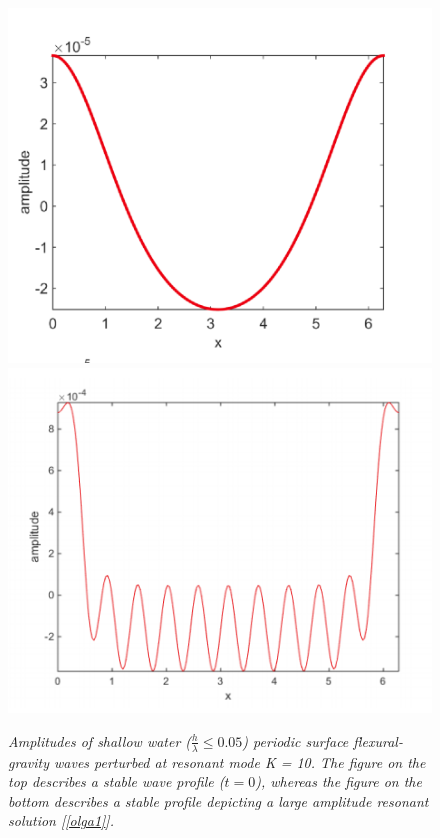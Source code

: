 \documentclass{article}
\begin{document}
\begin{figure}[hbt!]
\centering
\includegraphics[width=.5\textwidth]{Profile1.png}\hfill
\includegraphics[width=.5\textwidth]{Profile2.png}\hfill
\caption{\emph{Amplitudes of shallow water (\(\frac{h}{\lambda} \leq 0.05\)) periodic surface flexural-gravity waves perturbed at resonant mode K = 10. The figure on the top describes a stable wave profile (\(t = 0\)), whereas the figure on the bottom describes a stable profile depicting a large amplitude resonant solution [\ref{olga1}]. }}
\label{profile}
\end{figure}
\end{document}
